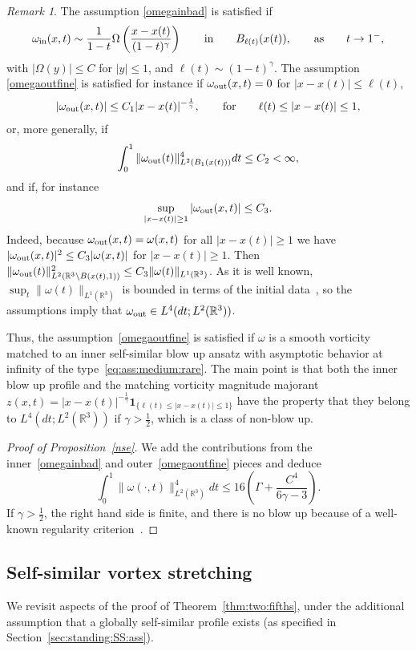 \documentclass[11pt,reqno]{amsproc}
\numberwithin{equation}{section}
\theoremstyle{remark}
\newtheorem{remark}[theorem]{Remark}
\newcommand{\la}{\label}
\newcommand{\fr}{\frac}
\newcommand{\be}{\begin{equation}}
\newcommand{\ee}{\end{equation}}
\newcommand{\Rr}{{\mathbb R}}
\begin{document}
\begin{remark}
The assumption \eqref{omegainbad} is satisfied if
\[
\omega_{\rm in}(x,t) \sim
\frac{1}{{1}-t}\Omega\left(\fr{x-x(t)}{({1}-t)^{\gamma}}\right) 
\qquad\mbox{in} \qquad B_{\ell(t)}(x(t)), 
\qquad\mbox{as} \qquad t \to 1^-,
\] 
with $|\Omega(y)| \le  C$ for $|y|\le 1$, {and $\ell(t) \sim (1-t)^\gamma$}. 
The assumption \eqref{omegaoutfine} is satisfied {for instance} if 
$\omega_{\rm out}(x,t) = 0$ for $|x-x(t)|\le \ell(t)$,
\[
|\omega_{\rm out}(x,t)| \le C_1 |x-x(t)|^{-\fr{1}{\gamma}}, 
\qquad \mbox{for} \qquad \ell(t) \leq |x-x(t)|\leq 1,
\]
or, more generally, if
\be
\int_0^1\|\omega_{\rm out}(t)\|^4_{L^2(B_1(x(t)))}dt 
\leq C_2 <\infty,
\la{outin}
\ee
and if, for instance
\[
\sup_{|x - x(t)|\ge 1}|\omega_{\rm out}(x,t)| \le C_3.
\] 
Indeed, because $\omega_{\rm out}(x,t) = \omega(x,t)$ for all $|x-x(t)|\ge 1$ we have  $|\omega_{\rm out}(x,t)|^2 \le C_3|\omega(x,t)|$ for 
$|x-x(t)|\ge 1$. Then $\|\omega_{\rm out}(t)\|_{L^2(\Rr^3\setminus B(x(t),1))}^2 \le C_3\|\omega(t)\|_{L^1(\Rr^3)}$. As it is well known, $\sup_t \|\omega (t)\|_{L^1(\Rr^3)}$ is bounded in terms of the initial data~\cite{ConstantinArea}, so the assumptions imply that $\omega_{\rm out}\in L^4(dt; L^2(\Rr^3))$. 

Thus, the assumption~\eqref{omegaoutfine}  is satisfied if $\omega$ is a smooth vorticity matched to an inner self-similar blow up ansatz with asymptotic behavior at infinity of the type~\eqref{eq:ass:medium:rare}. The main point is that both the inner blow up profile and the matching vorticity magnitude majorant  $z(x,t) = |x-x(t)|^{-\fr{1}{\gamma}}\mathbf 1_{\{\ell(t)\le |x-x(t)| \le 1\}}$ have the property  that  they belong to $ L^4(dt; L^2(\Rr^3))$ if $\gamma>\fr{1}{2}$, which is a class of non-blow up.
\end{remark}

\begin{proof}[{Proof of Proposition~\ref{nse}}]
We add the contributions {from the inner~\eqref{omegainbad} and outer~\eqref{omegaoutfine} pieces} and deduce
\begin{equation*}
\int_0^{{1}} \|\omega (\cdot,t)\|_{L^2(\Rr^3)}^4dt \le 16\left(\Gamma + \fr{C^4}{6\gamma-3}\right).
\end{equation*}
If $\gamma>\fr{1}{2}$, the right hand side is finite, and there is no blow up because of a well-known regularity criterion~\cite{CFbook}.
\end{proof}


\subsection{Self-similar vortex stretching}
We revisit aspects of the proof of Theorem~\ref{thm:two:fifths}, under the additional assumption that a globally self-similar profile exists (as specified in Section~\ref{sec:standing:SS:ass}).
\end{document}
